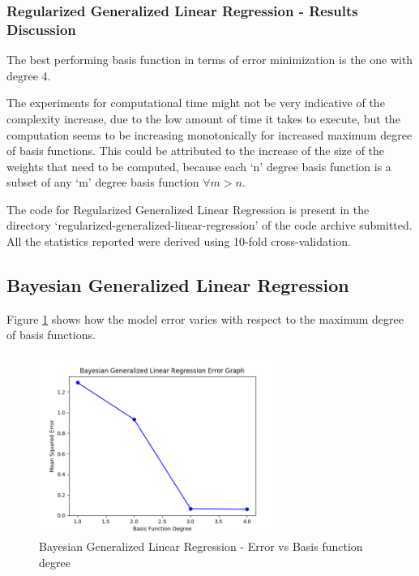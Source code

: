 \documentclass[parskip=full]{scrartcl}
\begin{document}
        \subsubsection*{Regularized Generalized Linear Regression - Results Discussion} %
        \label{ssub:regularized_generalized_linear_regression_results_discussion}

            The best performing basis function in terms of error minimization is the one with degree 4.

            The experiments for computational time might not be very indicative of the complexity increase, due to the low amount of time it takes to execute, but the computation seems to be increasing monotonically for increased maximum degree of basis functions. This could be attributed to the increase of the size of the weights that need to be computed, because each `n' degree basis function is a subset of any `m' degree basis function $\forall m > n$.
        

        The code for Regularized Generalized Linear Regression is present in the directory `regularized-generalized-linear-regression' of the code archive submitted. All the statistics reported were derived using 10-fold cross-validation.


    \subsection{Bayesian Generalized Linear Regression} %
    \label{sub:bayesian_generalized_linear_regression}
    
        Figure \ref{fig:bglg_err_v_deg} shows how the model error varies with respect to the maximum degree of basis functions.

        \begin{figure}
            \centering
            \includegraphics[width=0.7\textwidth]{3b_degree_vs_error.png}
            \caption{Bayesian Generalized Linear Regression - Error vs Basis function degree}
            \label{fig:bglg_err_v_deg}
        \end{figure}
\end{document}
